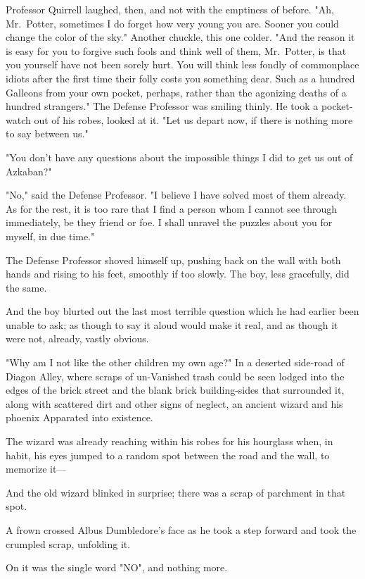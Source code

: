 Professor Quirrell laughed, then, and not with the emptiness of before. "Ah,
Mr.~Potter, sometimes I do forget how very young you are. Sooner you could
change the color of the sky." Another chuckle, this one colder. "And the reason
it is easy for you to forgive such fools and think well of them, Mr.~Potter, is
that you yourself have not been sorely hurt. You will think less fondly of
commonplace idiots after the first time their folly costs you something dear.
Such as a hundred Galleons from your own pocket, perhaps, rather than the
agonizing deaths of a hundred strangers." The Defense Professor was smiling
thinly. He took a pocket-watch out of his robes, looked at it. "Let us depart
now, if there is nothing more to say between us."

"You don't have any questions about the impossible things I did to get us out
of Azkaban?"

"No," said the Defense Professor. "I believe I have solved most of them
already. As for the rest, it is too rare that I find a person whom I cannot see
through immediately, be they friend or foe. I shall unravel the puzzles about
you for myself, in due time."

The Defense Professor shoved himself up, pushing back on the wall with both
hands and rising to his feet, smoothly if too slowly. The boy, less gracefully,
did the same.

And the boy blurted out the last most terrible question which he had earlier
been unable to ask; as though to say it aloud would make it real, and as though
it were not, already, vastly obvious.

"Why am I not like the other children my own age?"
\sbreak
In a deserted side-road of Diagon Alley, where scraps of un-Vanished trash
could be seen lodged into the edges of the brick street and the blank brick
building-sides that surrounded it, along with scattered dirt and other signs of
neglect, an ancient wizard and his phoenix Apparated into existence.

The wizard was already reaching within his robes for his hourglass when, in
habit, his eyes jumped to a random spot between the road and the wall, to
memorize it---

And the old wizard blinked in surprise; there was a scrap of parchment in that
spot.

A frown crossed Albus Dumbledore's face as he took a step forward and took the
crumpled scrap, unfolding it.

On it was the single word "NO", and nothing more.

